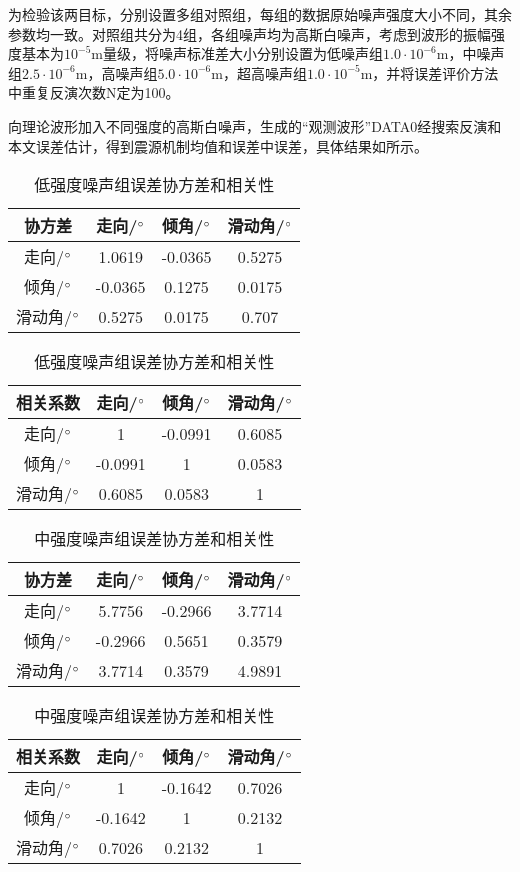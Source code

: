 为检验该两目标，分别设置多组对照组，每组的数据原始噪声强度大小不同，其余参数均一致。对照组共分为4组，各组噪声均为高斯白噪声，考虑到波形的振幅强度基本为$10^{-5}$m量级，将噪声标准差大小分别设置为低噪声组$1.0\cdot10^{-6}$m，中噪声组$2.5\cdot10^{-6}$m，高噪声组$5.0\cdot10^{-6}$m，超高噪声组$1.0\cdot10^{-5}$m，并将误差评价方法中重复反演次数N定为100。

向理论波形加入不同强度的高斯白噪声，生成的“观测波形”DATA0经搜索反演和本文误差估计，得到震源机制均值和误差中误差，具体结果如所示。
\begin{table}[ht]
\centering
\caption{低强度噪声组误差协方差和相关性}
\label{tab3_02}
    \begin{tabular}{c c c c}
    \hline
    协方差 & 走向/$^\circ$ & 倾角/$^\circ$ & 滑动角/$^\circ$ \\
    \hline
	走向/$^\circ$ 		&1.0619 	&-0.0365	&0.5275\\
	倾角/$^\circ$		&-0.0365	&0.1275		&0.0175\\
	滑动角/$^\circ$	&0.5275		&0.0175		&0.707\\
    \hline
    \end{tabular}
    \begin{tabular}{c c c c}
    \hline
    相关系数 & 走向/$^\circ$ & 倾角/$^\circ$ & 滑动角/$^\circ$ \\
    \hline
	走向/$^\circ$ 		&1 			&-0.0991	&0.6085\\
	倾角/$^\circ$		&-0.0991	&1			&0.0583\\
	滑动角/$^\circ$	&0.6085		&0.0583		&1\\
    \hline
    \end{tabular}
\end{table}

\begin{table}[ht]
\centering
\caption{中强度噪声组误差协方差和相关性}
\label{tab3_03}
    \begin{tabular}{c c c c}
    \hline
    协方差 & 走向/$^\circ$ & 倾角/$^\circ$ & 滑动角/$^\circ$ \\
    \hline
	走向/$^\circ$ 		&5.7756 	&-0.2966	&3.7714\\
	倾角/$^\circ$		&-0.2966	&0.5651		&0.3579\\
	滑动角/$^\circ$	&3.7714		&0.3579		&4.9891\\
    \hline
    \end{tabular}
    \begin{tabular}{c c c c}
    \hline
    相关系数 & 走向/$^\circ$ & 倾角/$^\circ$ & 滑动角/$^\circ$ \\
    \hline
	走向/$^\circ$ 		&1 			&-0.1642	&0.7026\\
	倾角/$^\circ$		&-0.1642	&1			&0.2132\\
	滑动角/$^\circ$	&0.7026		&0.2132		&1\\
    \hline
    \end{tabular}
\end{table}

